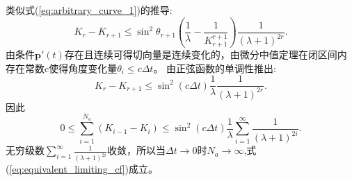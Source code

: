 类似式(\ref{eq:arbitrary_curve_1})的推导:
\begin{equation}
K_r-K_{r+1}\leq \sin^2\theta_{r+1}(\frac{1}{\lambda}-\frac{1}{K_{r+1}^{r+1}})\frac{1}{(\lambda+1)^{2r}}.
\end{equation}
由条件$\bm{p}'(t)$存在且连续可得切向量是连续变化的，由微分中值定理在闭区间内存在常数c使得角度变化量$\theta_i\leq c\Delta t$。
由正弦函数的单调性推出:
\begin{equation}
K_r-K_{r+1}\leq \sin^2 (c\Delta t) \frac{1}{\lambda}\frac{1}{(\lambda+1)^{2r}}.
\end{equation}
因此
\begin{equation}\label{eq:quatratic_convergence}
0\leq \sum_{i=1}^{N_a}(K_{i-1}-K_{i})\leq \sin^2 (c\Delta t) \frac{1}{\lambda}\sum_{i=1}^{\infty}\frac{1}{(\lambda+1)^{2i}}.
\end{equation}
无穷级数$\sum_{i=1}^{\infty}\frac{1}{(\lambda+1)^{2i}}$收敛，所以当$\Delta t\to 0$时$N_a\to \infty$,式(\ref{eq:equivalent_limiting_cf})成立。


